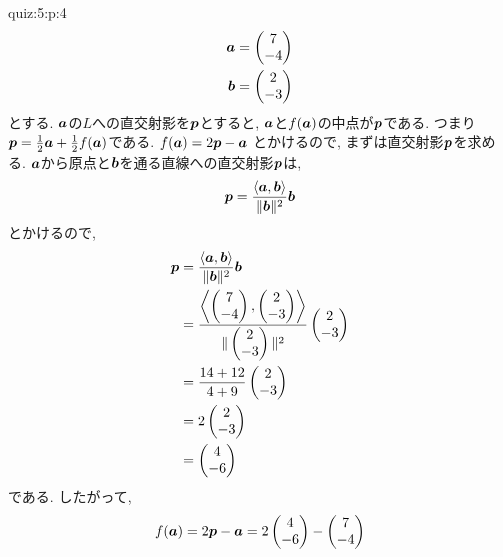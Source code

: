 \begin{answerof}{quiz:5:p:4}
  \begin{align*}
    \boldsymbol{a}&=\begin{pmatrix}7\\-4\end{pmatrix}\\
    \boldsymbol{b}&=\begin{pmatrix}2\\-3\end{pmatrix}
  \end{align*}
  とする.
  $\boldsymbol{a}$の$L$への直交射影を$\boldsymbol{p}$とすると,
  $\boldsymbol{a}$と$f(\boldsymbol{a})$の中点が$\boldsymbol{p}$である.
  つまり$\boldsymbol{p}=\frac{1}{2}\boldsymbol{a}+\frac{1}{2}f(\boldsymbol{a})$である.
  $f(\boldsymbol{a})=2\boldsymbol{p}-\boldsymbol{a}$
  とかけるので,
  まずは直交射影$\boldsymbol{p}$を求める.
$\boldsymbol{a}$から原点と$\boldsymbol{b}$を通る直線への直交射影$\boldsymbol{p}$は,
\begin{align*}
\boldsymbol{p}=\frac{\Braket{\boldsymbol{a},\boldsymbol{b}}}{\|\boldsymbol{b}\|^2}\boldsymbol{b}
\end{align*}
とかけるので,
\begin{align*}
  \boldsymbol{p}&=\frac{\Braket{\boldsymbol{a},\boldsymbol{b}}}{\|\boldsymbol{b}\|^2}\boldsymbol{b}\\
  &=\frac{\Braket{\begin{pmatrix}7\\-4\end{pmatrix},\begin{pmatrix}2\\-3\end{pmatrix}}}{\|\begin{pmatrix}2\\-3\end{pmatrix}\|^2}\begin{pmatrix}2\\-3\end{pmatrix}\\
  &=\frac{14+12}{4+9}\begin{pmatrix}2\\-3\end{pmatrix}\\
  &=2\begin{pmatrix}2\\-3\end{pmatrix}\\
  &=\begin{pmatrix}4\\-6\end{pmatrix}
\end{align*}
である.
したがって,
\begin{align*}
  f(\aaa)=2\pp-\aaa
  =2\begin{pmatrix}4\\-6\end{pmatrix}-\begin{pmatrix}7\\-4\end{pmatrix}\\

\end{align*}
\end{answerof}
